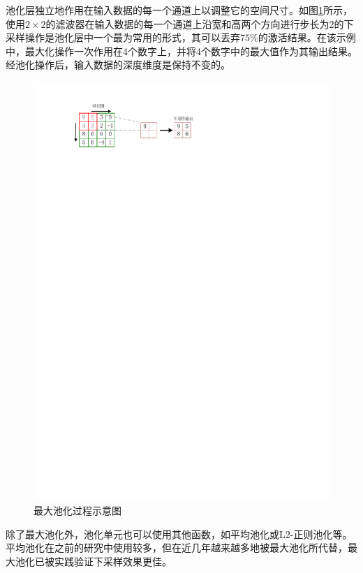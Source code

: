 池化层独立地作用在输入数据的每一个通道上以调整它的空间尺寸。如图\ref{figure:figure4}所示，使用$2\times2$的滤波器在输入数据的每一个通道上沿宽和高两个方向进行步长为2的下采样操作是池化层中一个最为常用的形式，其可以丢弃$75\%$的激活结果。在该示例中，最大化操作一次作用在4个数字上，并将4个数字中的最大值作为其输出结果。经池化操作后，输入数据的深度维度是保持不变的。

\begin{figure}[htbp]
    \begin{center}
    \includegraphics{figures/pool.pdf}
    \end{center}
    \caption{最大池化过程示意图}\label{figure:figure4}
\end{figure}

除了最大池化外，池化单元也可以使用其他函数，如平均池化或L2-正则池化等。平均池化在之前的研究中使用较多，但在近几年越来越多地被最大池化所代替，最大池化已被实践验证下采样效果更佳。

